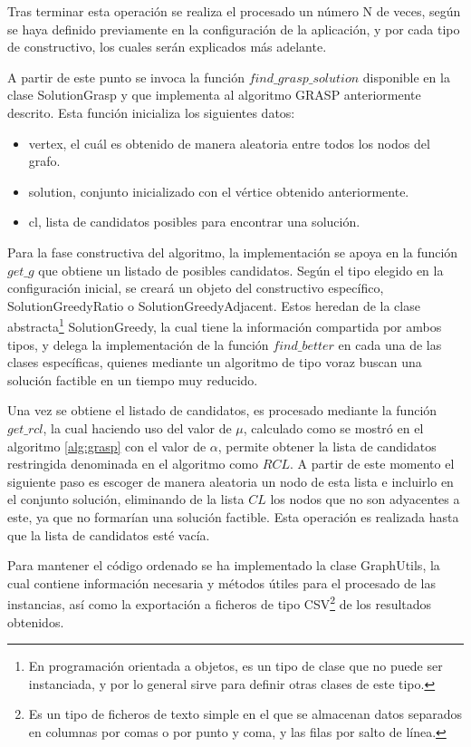Tras terminar esta operación se realiza el procesado un número N de veces, según se haya definido previamente en la configuración de la aplicación, y por cada tipo de constructivo, los cuales serán explicados más adelante.

A partir de este punto se invoca la función $find\_grasp\_solution$ disponible en la clase SolutionGrasp y que implementa al algoritmo \gls{GRASP} anteriormente descrito. Esta función inicializa los siguientes datos:
\begin{itemize}
	\item vertex, el cuál es obtenido de manera aleatoria entre todos los nodos del grafo.
	\item solution, conjunto inicializado con el vértice obtenido anteriormente.
	\item cl, lista de candidatos posibles para encontrar una solución.
\end{itemize}

Para la fase constructiva del algoritmo, la implementación se apoya en la función $get\_g$ que obtiene un listado de posibles candidatos. Según el tipo elegido en la configuración inicial, se creará un objeto del constructivo específico, SolutionGreedyRatio o SolutionGreedyAdjacent. Estos heredan de la clase abstracta\footnote{En programación orientada a objetos, es un tipo de clase que no puede ser instanciada, y por lo general sirve para definir otras clases de este tipo.} SolutionGreedy, la cual tiene la información compartida por ambos tipos, y delega la implementación de la función $find\_better$ en cada una de las clases específicas, quienes mediante un algoritmo de tipo voraz buscan una solución factible en un tiempo muy reducido.

Una vez se obtiene el listado de candidatos, es procesado mediante la función $get\_rcl$, la cual haciendo uso del valor de $\mu$, calculado como se mostró en el algoritmo \ref{alg:grasp} con el valor de $\alpha$, permite obtener la lista de candidatos restringida denominada en el algoritmo como $RCL$. A partir de este momento el siguiente paso es escoger de manera aleatoria un nodo de esta lista e incluirlo en el conjunto solución, eliminando de la lista $CL$ los nodos que no son adyacentes a este, ya que no formarían una solución factible. Esta operación es realizada hasta que la lista de candidatos esté vacía.

Para mantener el código ordenado se ha implementado la clase GraphUtils, la cual contiene información necesaria y métodos útiles para el procesado de las instancias, así como la exportación a ficheros de tipo CSV\footnote{Es un tipo de ficheros de texto simple en el que se almacenan datos separados en columnas por comas o por punto y coma, y las filas por salto de línea.} de los resultados obtenidos.


